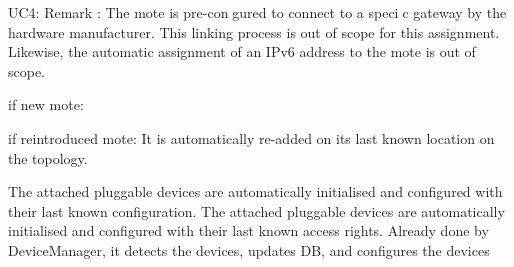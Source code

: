         UC4:
            Remark : The mote is pre-congured to connect to a specic gateway by
             the hardware manufacturer. This linking process is out of scope for
             this assignment. Likewise, the automatic assignment of an IPv6 address
             to the mote is out of scope.

            if new mote:

        if reintroduced mote:
            It is automatically re-added on its last known location on the topology.

            The attached pluggable devices are automatically initialised and configured with their last known configuration.
            The attached pluggable devices are automatically initialised and configured with their last known access rights.
                Already done by DeviceManager, it detects the devices, updates DB, and configures the devices


